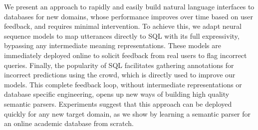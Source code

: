 We present an approach to rapidly and easily build natural language interfaces to databases for new domains, whose performance improves over time based on user feedback, and requires minimal intervention. To achieve this, we adapt neural sequence models to map utterances directly to SQL with its full expressivity, bypassing any intermediate meaning representations. These models are immediately deployed online to solicit feedback from real users to flag incorrect queries. Finally, the popularity of SQL facilitates gathering annotations for incorrect predictions using the crowd, which is directly used to improve our models. This complete feedback loop, without intermediate representations or database specific engineering, opens up new ways of building high quality semantic parsers. Experiments suggest that this approach can be deployed quickly for any new target domain, as we show by learning a semantic parser for an online academic database from scratch.
